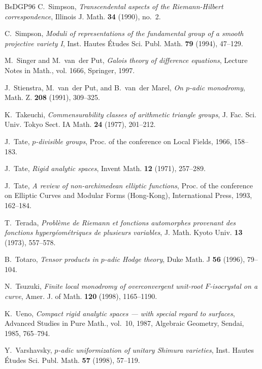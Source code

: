 \begin{thebibliography}{BsDGP96}
C.~Simpson, \emph{Transcendental aspects of the {R}iemann-{H}ilbert
  correspondence}, Illinois J. Math. \textbf{34} (1990), no.~2.

C.~Simpson, \emph{Moduli of representations of the fundamental group of a
  smooth projective variety {I}}, Inst. Hautes {\'E}tudes Sci. Publ. Math.
  \textbf{79} (1994), 47--129.

M.~Singer and M.~van~der Put, \emph{Galois theory of difference equations},
  Lecture Notes in Math., vol. 1666, Springer, 1997.

J.~Stienstra, M.~van~der Put, and B.~van~der Marel, \emph{On $p$-adic
  monodromy}, Math. Z. \textbf{208} (1991), 309--325.

K.~Takeuchi, \emph{Commensurability classes of arithmetic triangle groups}, J.
  Fac. Sci. Univ. Tokyo Sect. IA Math. \textbf{24} (1977), 201--212.

J.~Tate, \emph{$p$-divisible groups}, Proc. of the conference on Local Fields,
  1966, 158--183.

J.~Tate, \emph{Rigid analytic spaces}, Invent Math. \textbf{12} (1971),
  257--289.

J.~Tate, \emph{A review of non-archimedean elliptic functions}, Proc. of the
  conference on Elliptic Curves and Modular Forms (Hong-Kong), International
  Press, 1993, 162--184.

T.~Terada, \emph{Probl\`eme de {R}iemann et fonctions automorphes provenant des
  fonctions hyperg\'eom\'etriques de plusieurs variables}, J. Math. Kyoto Univ.
  \textbf{13} (1973), 557--578.

B.~Totaro, \emph{Tensor products in $p$-adic {H}odge theory}, Duke Math. J
  \textbf{56} (1996), 79--104.

N.~Tsuzuki, \emph{Finite local monodromy of overconvergent unit-root
  ${F}$-isocrystal on a curve}, Amer. J. of Math. \textbf{120} (1998),
  1165--1190.

K.~Ueno, \emph{Compact rigid analytic spaces --- with special regard to
  surfaces}, Advanced Studies in Pure Math., vol.~10, 1987, Algebraic Geometry,
  Sendai, 1985, 765--794.

Y.~Varshavsky, \emph{$p$-adic uniformization of unitary {S}himura varieties},
  Inst. Hautes {\'E}tudes Sci. Publ. Math. \textbf{57} (1998), 57--119.


\end{thebibliography}
